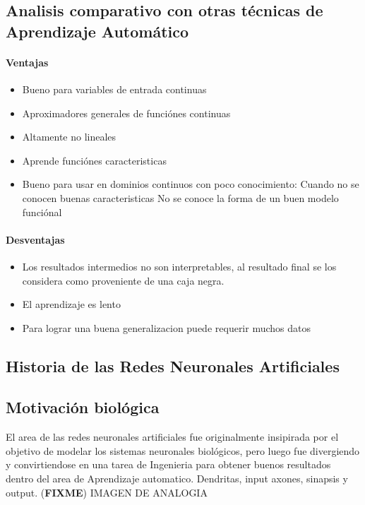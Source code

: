 \documentclass[a4paper,11pt,spanish]{book}
\newcommand*{\FIXME}[1]{{(\textbf{FIXME}) {#1}}}
\begin{document}
      \subsection{Analisis comparativo con otras técnicas de Aprendizaje Automático}
	\paragraph {Ventajas}
	  \begin{itemize}
	    \item Bueno para variables de entrada continuas
	    \item Aproximadores generales de funciónes continuas
	    \item Altamente no lineales
	    \item Aprende funciónes caracteristicas
	    \item Bueno para usar en dominios continuos con poco conocimiento:
	      \subitem Cuando no se conocen buenas caracteristicas
	      \subitem No se conoce la forma de un buen modelo funciónal
	  \end{itemize}
	\paragraph {Desventajas}
	  \begin{itemize}
	    \item Los resultados intermedios no son interpretables, al resultado final se los considera como proveniente de una caja negra.
	    \item El aprendizaje es lento
	    \item Para lograr una buena generalizacion puede requerir muchos datos
	  \end{itemize}

      \subsection {Historia de las Redes Neuronales Artificiales}
      
      \subsection {Motivación biológica} 
	El area de las redes neuronales artificiales fue originalmente insipirada por el objetivo de modelar los sistemas neuronales biológicos, 
	pero luego fue divergiendo
	y convirtiendose en una tarea de Ingenieria para obtener buenos resultados dentro del area de Aprendizaje automatico.
	Dendritas, input axones, sinapsis y output.
	\FIXME {IMAGEN DE ANALOGIA}
\end{document}

